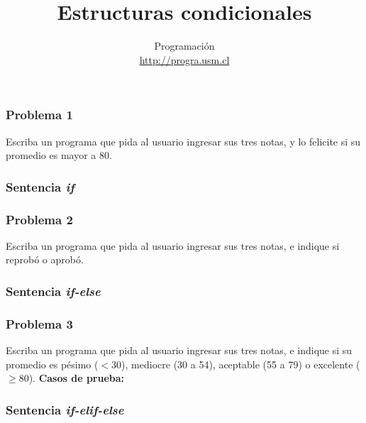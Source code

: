 \documentclass[12pt]{beamer}
\title{Estructuras condicionales}
\author{
  Programación \\ \url{http://progra.usm.cl}
}
\date{}
\begin{document}
  \begin{frame}
    \maketitle
  \end{frame}

  \begin{frame}
    \frametitle{Problema 1}
    \label{problema-if}
    Escriba un programa que pida al usuario
    ingresar sus tres notas,
    y lo felicite si su promedio es mayor a 80.
    \vfill
    
    
  \end{frame}

  \begin{frame}
    \frametitle{Sentencia \emph{if}}
    \label{solucion-if}
    
  \end{frame}

  \begin{frame}
    \frametitle{Problema 2}
    \label{problema-if-else}
    Escriba un programa que pida al usuario
    ingresar sus tres notas,
    e indique si reprobó o aprobó.
    \vfill
    
    
  \end{frame}

  \begin{frame}
    \frametitle{Sentencia \emph{if-else}}
    \label{solucion-if-else}
    
  \end{frame}

  \begin{frame}
    \frametitle{Problema 3}
    \label{problema-if-elif}
    Escriba un programa que pida al usuario
    ingresar sus tres notas,
    e indique si su promedio
    es pésimo (\(<30\)),  mediocre (30 a 54),
    aceptable (55 a 79) o excelente (\(\ge 80\)).
    \vfill
    \textbf{Casos de prueba:}\\
    
    
  \end{frame}

  \begin{frame}
    \frametitle{Sentencia \emph{if-elif-else}}
    \label{solucion-if-elif}
    
  \end{frame}
\end{document}
